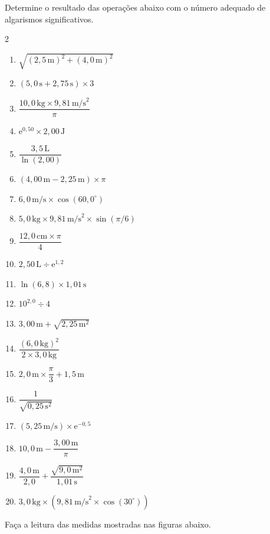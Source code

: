 \begin{question}[type={exam}]
Determine o resultado das operações abaixo com o número adequado de algarismos significativos.
\begin{multicols}{2}
\begin{enumerate}
\item $\sqrt{(2{,}5\,\text{m})^2 + (4{,}0\,\text{m})^2}$
\item $(5{,}0\,\text{s} + 2{,}75\,\text{s}) \times 3$
\item $\dfrac{10{,}0\,\text{kg} \times 9{,}81\,\text{m/s}^2}{\pi}$
\item $\mathrm{e}^{0{,}50} \times 2{,}00\,\text{J}$
\item $\dfrac{3{,}5\,\text{L}}{\ln(2,00)}$
\item $(4{,}00\,\text{m} - 2{,}25\,\text{m}) \times \pi$
\item $6{,}0\,\text{m/s} \times \cos(60,0^\circ)$
\item $5{,}0\,\text{kg} \times 9{,}81\,\text{m/s}^2 \times \sin(\pi/6)$
\item $\dfrac{12{,}0\,\text{cm} \times \pi}{4}$
\item $2{,}50\,\text{L} \div \mathrm{e}^{1{,}2}$
\item $\ln(6,8) \times 1{,}01\,\text{s}$
\item $10^{2{,}0} \div 4$
\item $3{,}00\,\text{m} + \sqrt{2{,}25\,\text{m}^2}$
\item $\dfrac{(6{,}0\,\text{kg})^2}{2 \times 3{,}0\,\text{kg}}$
\item $2{,}0\,\text{m} \times \dfrac{\pi}{3} + 1{,}5\,\text{m}$
\item $\dfrac{1}{\sqrt{0{,}25\,\text{s}^2}}$
\item $(5{,}25\,\text{m/s}) \times \mathrm{e}^{-0{,}5}$
\item $10{,}0\,\text{m} - \dfrac{3{,}00\,\text{m}}{\pi}$
\item $\dfrac{4{,}0\,\text{m}}{2{,}0} + \dfrac{\sqrt{9{,}0\,\text{m}^2}}{1{,}01\,\text{s}}$
\item $3{,}0\,\text{kg} \times \left( 9{,}81\,\text{m/s}^2 \times \cos(30^\circ) \right)$
\end{enumerate}

\end{multicols}
\end{question}

\begin{question}[type={exam}]
Faça a leitura das medidas mostradas nas figuras abaixo.
\end{question}

